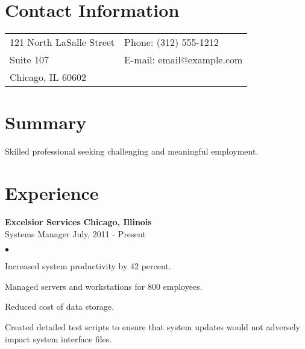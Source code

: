 \documentclass[margin,line]{res}
\newenvironment{list2}{
  \begin{list}{$\bullet$}{%
      \setlength{\itemsep}{0in} 
      \setlength{\parsep}{0in} \setlength{\parskip}{0in}
      \setlength{\topsep}{0in} \setlength{\partopsep}{0in} 
      \setlength{\leftmargin}{0.2in}}}{\end{list}}
\begin{document}
\color{black}


\begin{resume}
\section{\sc Contact Information}
\vspace{.05in}
\begin{tabular}{@{}p{2in}p{4in}}
121 North LaSalle Street  	& {Phone:}    (312) 555-1212 \\            
Suite 107			              & {E-mail:}   email@example.com \\         
Chicago, IL 60602 \\       
\end{tabular}


\section{\sc Summary}
Skilled professional seeking challenging and meaningful employment.

\section{\sc Experience}
{\bf Excelsior Services} 	\hfill {\bf Chicago, Illinois}\\
\vspace{-.3cm}
{Systems Manager} \hfill {July, 2011 - Present}\\
\vspace*{-.0in}
\begin{list2}
\item Increased system productivity by 42 percent. 
\item Managed servers and workstations for 800 employees.
\item Reduced cost of data storage.
\item Created detailed test scripts to ensure that system updates would not 
adversely impact system interface files.
\end{list2}


\end{resume}
\end{document}
